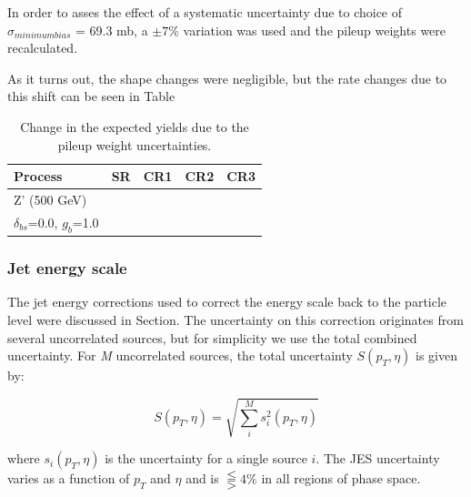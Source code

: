 In order to asses the effect of a systematic uncertainty due to choice of $\sigma_{minimum bias}$ = 69.3 mb, a $\pm 7\%$ variation was used and the pileup weights were recalculated.

As it turns out, the shape changes were negligible, but the rate changes due to this shift can be seen in Table 

\begin{table}[hbtp]\footnotesize
	\centering
	\begin{tabular}{l l l l l}
		\hline
		\textbf{Process} & SR & CR1 & CR2 & CR3 \\
		\hline
		Z' (500 GeV) &  & & &  \\
		$\delta_{bs}$=0.0, $g_{b}$=1.0  &  & & &  \\
		\hline
	\end{tabular}
	\caption{Change in the expected yields due to the pileup weight uncertainties.}
	\label{tab:pu_rate}
\end{table}



\subsubsection{Jet energy scale}
The jet energy corrections used to correct the energy scale back to the particle level were discussed in Section. The uncertainty on this correction originates from several uncorrelated sources, but for simplicity we use the total combined uncertainty. For \textit{M} uncorrelated sources, the total uncertainty $S(p_{T},\eta)$ is given by:

\begin{equation}
S(p_{T},\eta)= \sqrt{\sum_{i}^{M}s_{i}^{2}(p_{T},\eta)}
\end{equation}

where $s_{i}(p_{T},\eta)$ is the uncertainty for a single source $i$. The JES uncertainty varies as a function of $p_{T}$ and $\eta$ and is $\lesseqqgtr 4\%$ in all regions of phase space. %

